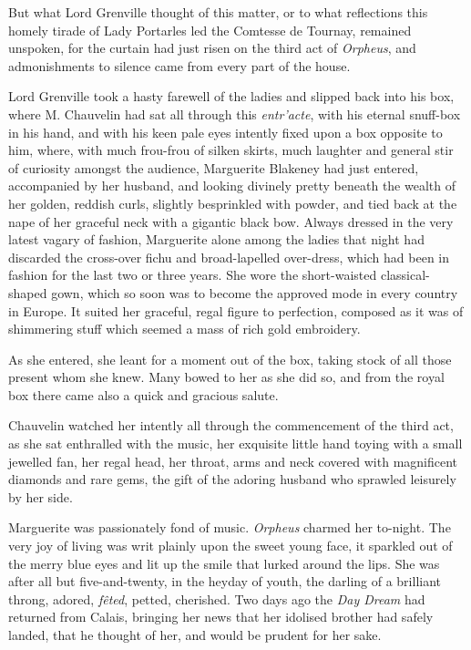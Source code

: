 But what Lord Grenville thought of this matter, or to what reflections this homely tirade of Lady Portarles led the Comtesse de Tournay, remained unspoken, for the curtain had just risen on the third act of \textit{Orpheus}, and admonishments to silence came from every part of the house.

Lord Grenville took a hasty farewell of the ladies and slipped back into his box, where M. Chauvelin had sat all through this \textit{entr'acte}, with his eternal snuff-box in his hand, and with his keen pale eyes intently fixed upon a box opposite to him, where, with much frou-frou of silken skirts, much laughter and general stir of curiosity amongst the audience, Marguerite Blakeney had just entered, accompanied by her husband, and looking divinely pretty beneath the wealth of her golden, reddish curls, slightly besprinkled with powder, and tied back at the nape of her graceful neck with a gigantic black bow. Always dressed in the very latest vagary of fashion, Marguerite alone among the ladies that night had discarded the cross-over fichu and broad-lapelled over-dress, which had been in fashion for the last two or three years. She wore the short-waisted classical-shaped gown, which so soon was to become the approved mode in every country in Europe. It suited her graceful, regal figure to perfection, composed as it was of shimmering stuff which seemed a mass of rich gold embroidery.

As she entered, she leant for a moment out of the box, taking stock of all those present whom she knew. Many bowed to her as she did so, and from the royal box there came also a quick and gracious salute.

Chauvelin watched her intently all through the commencement of the third act, as she sat enthralled with the music, her exquisite little hand toying with a small jewelled fan, her regal head, her throat, arms and neck covered with magnificent diamonds and rare gems, the gift of the adoring husband who sprawled leisurely by her side.

Marguerite was passionately fond of music. \textit{Orpheus} charmed her to-night. The very joy of living was writ plainly upon the sweet young face, it sparkled out of the merry blue eyes and lit up the smile that lurked around the lips. She was after all but five-and-twenty, in the heyday of youth, the darling of a brilliant throng, adored, \textit{fêted}, petted, cherished. Two days ago the \textit{Day Dream} had returned from Calais, bringing her news that her idolised brother had safely landed, that he thought of her, and would be prudent for her sake.

